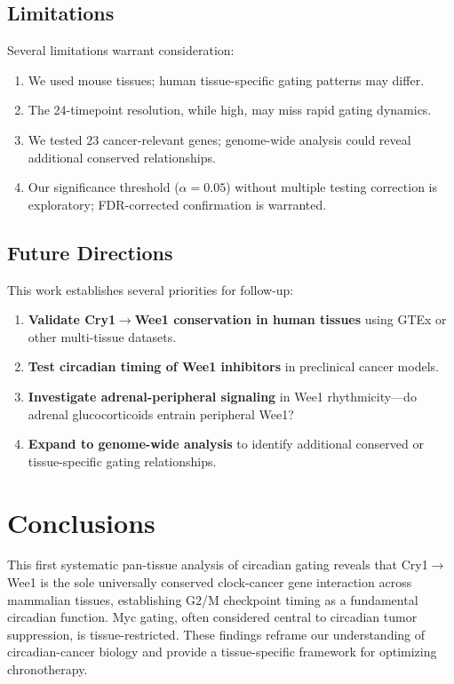 \documentclass[11pt,letterpaper]{article}
\begin{document}
\subsection{Limitations}

Several limitations warrant consideration:
\begin{enumerate}[noitemsep]
    \item We used mouse tissues; human tissue-specific gating patterns may differ.
    \item The 24-timepoint resolution, while high, may miss rapid gating dynamics.
    \item We tested 23 cancer-relevant genes; genome-wide analysis could reveal additional conserved relationships.
    \item Our significance threshold ($\alpha=0.05$) without multiple testing correction is exploratory; FDR-corrected confirmation is warranted.
\end{enumerate}

\subsection{Future Directions}

This work establishes several priorities for follow-up:
\begin{enumerate}[noitemsep]
    \item \textbf{Validate Cry1$\rightarrow$Wee1 conservation in human tissues} using GTEx or other multi-tissue datasets.
    \item \textbf{Test circadian timing of Wee1 inhibitors} in preclinical cancer models.
    \item \textbf{Investigate adrenal-peripheral signaling} in Wee1 rhythmicity---do adrenal glucocorticoids entrain peripheral Wee1?
    \item \textbf{Expand to genome-wide analysis} to identify additional conserved or tissue-specific gating relationships.
\end{enumerate}

\section{Conclusions}

This first systematic pan-tissue analysis of circadian gating reveals that Cry1$\rightarrow$Wee1 is the sole universally conserved clock-cancer gene interaction across mammalian tissues, establishing G2/M checkpoint timing as a fundamental circadian function. Myc gating, often considered central to circadian tumor suppression, is tissue-restricted. These findings reframe our understanding of circadian-cancer biology and provide a tissue-specific framework for optimizing chronotherapy.
\end{document}
